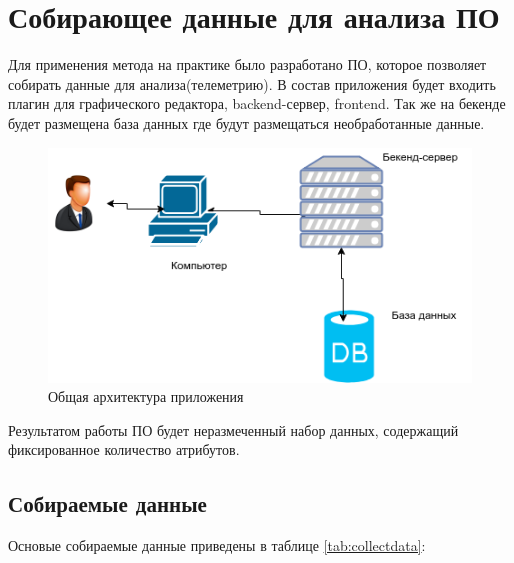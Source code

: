 \section{Собирающее данные для анализа ПО}
Для применения метода на практике было разработано ПО, которое позволяет собирать данные для анализа(телеметрию). В состав приложения будет входить плагин для графического редактора, backend-сервер, frontend. Так же на бекенде будет размещена база данных где будут размещаться необработанные данные.
 
\begin{figure}[h]
	\centering
	\includegraphics[width=.5\textwidth]{diagrams/diagram2.png}
	\caption{Общая архитектура приложения}\label{cha:design}
	\label{fig07}
\end{figure}
Результатом работы ПО будет неразмеченный набор данных, содержащий фиксированное количество атрибутов.
\subsection{Собираемые данные}
Основые собираемые данные приведены в таблице \ref{tab:collectdata}:

